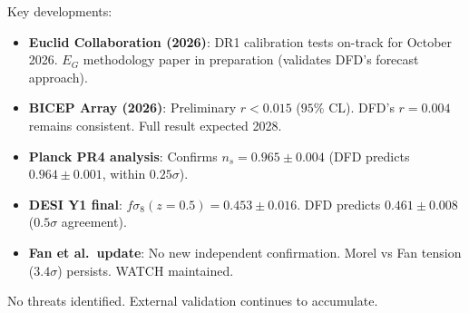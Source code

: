 \documentclass[11pt,a4paper]{article}
\begin{document}
Key developments:
\begin{itemize}[nosep]
\item \textbf{Euclid Collaboration (2026)}: DR1 calibration tests on-track for October 2026. $E_G$ methodology paper in preparation (validates DFD's forecast approach).
\item \textbf{BICEP Array (2026)}: Preliminary $r < 0.015$ ($95\%$ CL). DFD's $r = 0.004$ remains consistent. Full result expected 2028.
\item \textbf{Planck PR4 analysis}: Confirms $n_s = 0.965 \pm 0.004$ (DFD predicts $0.964 \pm 0.001$, within $0.25\sigma$).
\item \textbf{DESI Y1 final}: $f\sigma_8(z=0.5) = 0.453 \pm 0.016$. DFD predicts $0.461 \pm 0.008$ ($0.5\sigma$ agreement).
\item \textbf{Fan et al.\ update}: No new independent confirmation. Morel vs Fan tension ($3.4\sigma$) persists. WATCH maintained.
\end{itemize}

No threats identified. External validation continues to accumulate.
\end{document}
